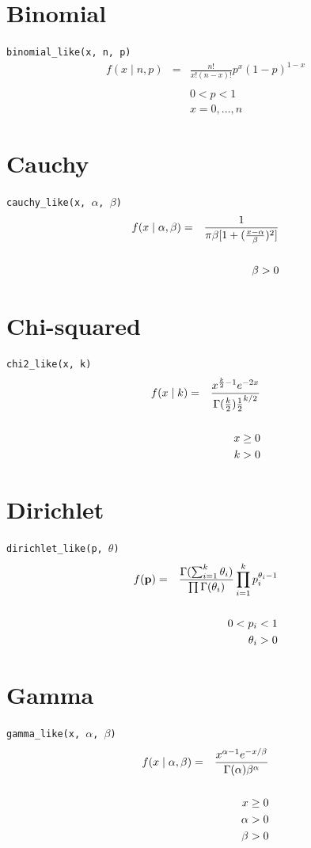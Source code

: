 \documentclass[]{book}
\begin{document}
\section*{Binomial}
\verb=binomial_like(x, n, p)=
\begin{eqnarray*}
f(x \mid n, p) &=& \frac{n!}{x!(n-x)!}p^x (1-p)^{1-x} \\
\\
&&0 < p < 1 \\
&&x = 0,\ldots,n
\end{eqnarray*}

\section*{Cauchy}
\verb=cauchy_like(x, =$\alpha$\verb=, =$\beta$\verb=)=
\begin{eqnarray*}
f(x \mid \alpha, \beta) &=& \frac{1}{\pi \beta [1 + (\frac{x-\alpha}{\beta})^2]} \\
\vspace{2cm}\\
&& \beta > 0
\end{eqnarray*}

\section*{Chi-squared}
\verb=chi2_like(x, k)=
\begin{eqnarray*}
f(x \mid k) &=& \frac{x^{\frac{k}{2}-1}e^{-2x}}{\Gamma(\frac{k}{2}) \frac{1}{2}^{k/2}} \\
\vspace{2cm}\\
&& x \ge 0 \\
&& k > 0
\end{eqnarray*}

\section*{Dirichlet}
\verb=dirichlet_like(p, =$\theta$\verb=)=
\begin{eqnarray*}
f(\mathbf{p}) &=& \frac{\Gamma(\sum_{i=1}^k \theta_i)}{\prod \Gamma(\theta_i)} \prod_{i=1}^k p_i^{\theta_i - 1}\\
\vspace{2cm}\\
&& 0 < p_i < 1 \\
&& \theta_i > 0
\end{eqnarray*}

\section*{Gamma}
\verb=gamma_like(x, =$\alpha$\verb=, =$\beta$\verb=)=
\begin{eqnarray*}
f(x \mid \alpha, \beta) &=& \frac{x^{\alpha-1}e^{-x/\beta}}{\Gamma(\alpha) \beta^{\alpha}} \\
\vspace{2cm}\\
&& x \ge 0 \\
&& \alpha > 0 \\
&& \beta > 0
\end{eqnarray*}
\end{document}
